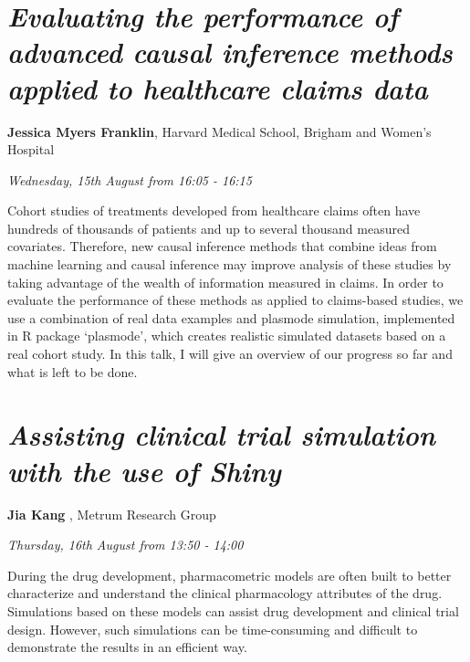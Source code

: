 \documentclass[]{book}
\theoremstyle{definition}
\theoremstyle{definition}
\theoremstyle{definition}
\theoremstyle{remark}
\begin{document}
\hypertarget{evaluating-the-performance-of-advanced-causal-inference-methods-applied-to-healthcare-claims-data}{%
\section{\texorpdfstring{\emph{Evaluating the performance of advanced
causal inference methods applied to healthcare claims
data}}{Evaluating the performance of advanced causal inference methods applied to healthcare claims data}}\label{evaluating-the-performance-of-advanced-causal-inference-methods-applied-to-healthcare-claims-data}}

\textbf{Jessica Myers Franklin}, Harvard Medical School, Brigham and
Women's Hospital

\emph{Wednesday, 15th August from 16:05 - 16:15}

Cohort studies of treatments developed from healthcare claims often have
hundreds of thousands of patients and up to several thousand measured
covariates. Therefore, new causal inference methods that combine ideas
from machine learning and causal inference may improve analysis of these
studies by taking advantage of the wealth of information measured in
claims. In order to evaluate the performance of these methods as applied
to claims-based studies, we use a combination of real data examples and
plasmode simulation, implemented in R package `plasmode', which creates
realistic simulated datasets based on a real cohort study. In this talk,
I will give an overview of our progress so far and what is left to be
done.

\hypertarget{assisting-clinical-trial-simulation-with-the-use-of-shiny}{%
\section{\texorpdfstring{\emph{Assisting clinical trial simulation with
the use of
Shiny}}{Assisting clinical trial simulation with the use of Shiny}}\label{assisting-clinical-trial-simulation-with-the-use-of-shiny}}

\textbf{Jia Kang }, Metrum Research Group

\emph{Thursday, 16th August from 13:50 - 14:00}

During the drug development, pharmacometric models are often built to
better characterize and understand the clinical pharmacology attributes
of the drug. Simulations based on these models can assist drug
development and clinical trial design. However, such simulations can be
time-consuming and difficult to demonstrate the results in an efficient
way.
\end{document}
